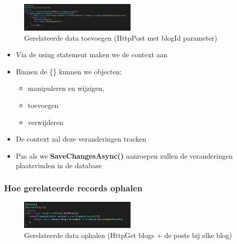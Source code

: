 \documentclass{article}
\begin{document}
\begin{figure}[H]
    \centering
    \includegraphics[width=0.5\textwidth]{efcore-insert-related.png}
    \caption{Gerelateerde data toevoegen (HttpPost met blogId parameter)}
\end{figure}


\begin{itemize}
    \item Via de using statement maken we de context aan
    \item Binnen de \{\} kunnen we objecten:
    \begin{itemize}
        \item manipuleren en wijzigen, 
        \item toevoegen
        \item verwijderen
    \end{itemize}
    \item De context zal deze veranderingen tracken
    \item Pas als we \textbf{SaveChangesAsync()} aanroepen zullen de veranderingen plaatsvinden in de database
\end{itemize}

\subsubsection{Hoe gerelateerde records ophalen}

\begin{figure}[H]
    \centering
    \includegraphics[width=0.5\textwidth]{efcore-select-related.png}
    \caption{Gerelateerde data ophalen (HttpGet blogs + de posts bij elke blog)}
\end{figure}
\end{document}
